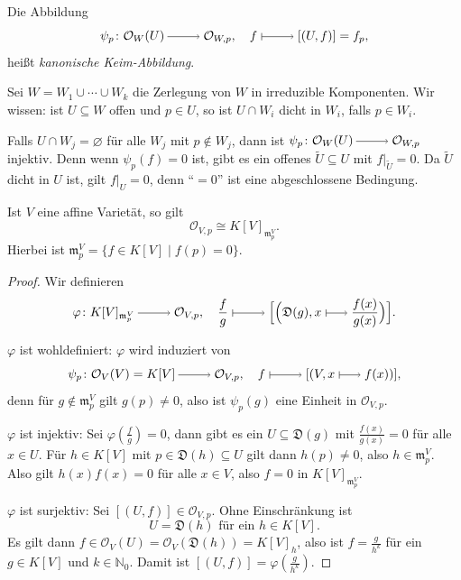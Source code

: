 \documentclass[a4paper,12pt,index=toc]{scrbook}
\theoremstyle{keinenummern} %
\def\O{\mathcal{O}}
\newcommand{\D}{\mathfrak{D}}
\def\m{\mathfrak{m}}
\renewcommand{\phi}{\varphi}
\newcommand{\leer}{\ensuremath{\varnothing}}
\newcommand{\restrict}[1]{|_{#1}}
\newcommand{\schlange}[1]{\widetilde{#1}}
\newcommand{\set}[1]{\ensuremath{\mathbb{#1}}}
\newcommand{\N}{\set{N}}
\begin{document}
\begin{bem}\label{3.1.4}
  Die Abbildung \begin{equation*} \psi_p\colon \O_W(U)\ra\O_{W,p},\quad f\mapsto[(U,f)]=f_p, \end{equation*} heißt \emph{kanonische Keim-Abbildung}.

  Sei $W=W_1\cup\dotsm\cup W_k$ die Zerlegung von $W$ in irreduzible Komponenten. Wir wissen: ist $U\subseteq W$ offen und $p\in
  U$, so ist $U\cap W_i$ dicht in $W_i$, falls $p\in W_i$.

  Falls $U\cap W_j=\leer$ für alle $W_j$ mit $p\notin W_j$, dann ist $\psi_p\colon\O_W(U)\ra\O_{W,p}$ injektiv. Denn wenn
  $\psi_p(f)=0$ ist, gibt es ein offenes $\schlange{U}\subseteq U$ mit $f\restrict{\schlange{U}}=0$. Da $\schlange{U}$ dicht in $U$ ist,
  gilt $f\restrict{U}=0$, denn \enquote{$=0$} ist eine abgeschlossene Bedingung.
\end{bem}

\begin{prop}\label{3.1.5}
  Ist $V$ eine affine Varietät, so gilt \begin{equation*} \O_{V,p}\cong K[V]_{\m_p^V}. \end{equation*}
  Hierbei ist $\m_p^V = \{ f\in K[V] \mid f(p)=0\}$.
\end{prop}
\begin{proof}
  Wir definieren
  \begin{equation*} \phi\colon K[V]_{\m_p^V}\ra\O_{V,p},\quad\frac{f}{g}\mapsto\Bigl[\Bigl(\D(g),x\smapsto\frac{f(x)}{g(x)}\Bigr)\Bigr]. \end{equation*}

  $\phi$ ist wohldefiniert: $\phi$ wird induziert von
  \begin{equation*} \psi_p\colon \O_V(V)=K[V]\ra\O_{V,p},\quad f\mapsto[(V,x\smapsto f(x))], \end{equation*}
  denn für $g\notin \m_p^V$ gilt $g(p)\neq0$, also ist $\psi_p(g)$ eine Einheit in $\O_{V,p}$.

  $\phi$ ist injektiv: Sei $\phi(\frac{f}{g})=0$, dann gibt es ein $U\subseteq\D(g)$ mit $\frac{f(x)}{g(x)}=0$ für alle $x\in
  U$. Für $h\in K[V]$ mit $p\in\D(h)\subseteq U$ gilt dann $h(p)\neq0$, also $h\in \m_p^V$. Also gilt $h(x)f(x)=0$ für alle
  $x\in V$, also $f=0$ in $K[V]_{\m_p^V}$.

  $\phi$ ist surjektiv: Sei $[(U,f)]\in\O_{V,p}$. Ohne Einschränkung ist \begin{equation*}U=\D(h)\text{ für ein }h\in K[V].\end{equation*} Es gilt dann
  $f\in\O_V(U)=\O_V(\D(h))=K[V]_h$, also ist $f=\frac{g}{h^k}$ für ein $g\in K[V]$ und $k\in\N_0$. Damit ist
  $[(U,f)]=\phi(\frac{g}{h^k})$.  
\end{proof}
\end{document}
